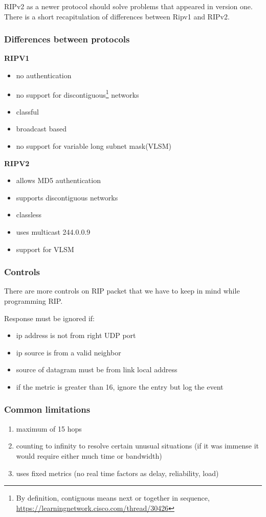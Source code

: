 \documentclass[11pt,a4paper]{article}
\begin{document}
\noindent
RIPv2 as a newer protocol should solve problems that appeared in version one. There is a short recapitulation of differences between Ripv1 and RIPv2. 

\subsubsection{Differences between protocols}

\textbf{RIPV1}
\begin{itemize}
\item no authentication
\item no support for discontiguous\footnote{By definition, contiguous means next or together in sequence, \url{https://learningnetwork.cisco.com/thread/30426}} networks
\item classful
\item broadcast based
\item no support for variable long subnet mask(VLSM)
\end{itemize}

\noindent
\textbf{RIPV2}
\begin{itemize}
\item allows MD5 authentication
\item supports discontiguous networks
\item classless
\item uses multicast 244.0.0.9
\item support for VLSM
\end{itemize}

\subsubsection{Controls}
There are more controls on RIP packet that we have to keep in mind while programming RIP.

Response must be ignored if:
\begin{itemize}
\item ip address is not from right UDP port
\item ip source is from a valid neighbor
\item source of datagram must be from link local address
\item if the metric is greater than 16, ignore the entry but log the event
\end{itemize}

\subsubsection{Common limitations}
\begin{enumerate}
\item maximum of 15 hops
\item counting to infinity to resolve certain unusual situations (if it was immense it would require either much time or bandwidth)
\item uses fixed metrics (no real time factors as delay, reliability, load)
\end{enumerate}
\end{document}
